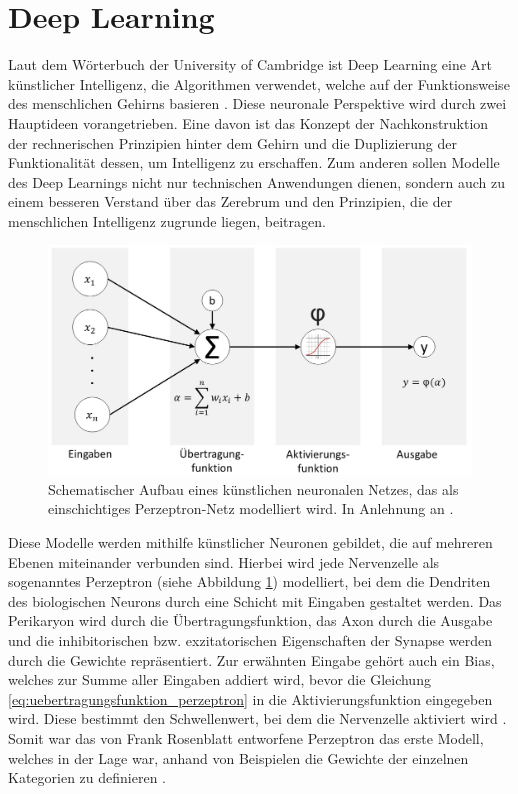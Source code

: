 %
%
\section{Deep Learning}\label{sec:?}
Laut dem Wörterbuch der University of Cambridge ist Deep Learning eine Art künstlicher Intelligenz, die Algorithmen verwendet, welche auf der Funktionsweise des menschlichen Gehirns basieren \cite{cambridge_dl}. Diese neuronale Perspektive wird durch zwei Hauptideen vorangetrieben. Eine davon ist das Konzept der Nachkonstruktion der rechnerischen Prinzipien hinter dem Gehirn und die Duplizierung der Funktionalität dessen, um Intelligenz zu erschaffen. Zum anderen sollen Modelle des Deep Learnings nicht nur technischen Anwendungen dienen, sondern auch zu einem besseren Verstand über das Zerebrum und den Prinzipien, die der menschlichen Intelligenz zugrunde liegen, beitragen. \cite{Goodfellow-et-al-2016}

\begin{figure}[h!]
\centering
\includegraphics[width=12cm]{98_images/perceptron.png}
\caption{Schematischer Aufbau eines künstlichen neuronalen Netzes, das als einschichtiges Perzeptron-Netz modelliert wird. In Anlehnung an  \cite{Deep-Learning-mit-tf-keras-und-tfjs}.}
\label{fig:perceptron}
\end{figure}

\mypar Diese Modelle werden mithilfe künstlicher Neuronen gebildet, die auf mehreren Ebenen miteinander verbunden sind. Hierbei wird jede Nervenzelle als sogenanntes Perzeptron (siehe Abbildung \ref{fig:perceptron}) modelliert, bei dem die Dendriten des biologischen Neurons durch eine Schicht mit Eingaben gestaltet werden. Das Perikaryon wird durch die Übertragungsfunktion, das Axon durch die Ausgabe und die inhibitorischen bzw. exzitatorischen Eigenschaften der Synapse werden durch die Gewichte repräsentiert. Zur erwähnten Eingabe gehört auch ein Bias, welches zur Summe aller Eingaben addiert wird, bevor die Gleichung \ref{eq:uebertragungsfunktion_perzeptron} in die Aktivierungsfunktion eingegeben wird. Diese bestimmt den Schwellenwert, bei dem die Nervenzelle aktiviert wird \cite{Deep-Learning-mit-tf-keras-und-tfjs}. Somit war das von Frank Rosenblatt entworfene Perzeptron das erste Modell, welches in der Lage war, anhand von Beispielen die Gewichte der einzelnen Kategorien zu definieren \cite{The-Perceptron}.

